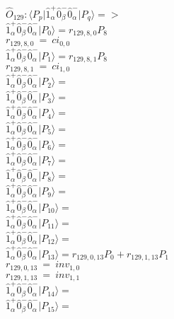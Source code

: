 \documentclass[14pt]{article}
\begin{document}
    $\hat{O}_{129}:  \langle{P_p}\vert \hat{1}_{\alpha}^{+}\hat{0}_{\beta}^{-}\hat{0}_{\alpha}^{-} \vert{P_q}\rangle => $ \\ 
    $ \hat{1}_{\alpha}^{+}\hat{0}_{\beta}^{-}\hat{0}_{\alpha}^{-} \vert{P_{0}}\rangle = {r}_{129,8,0}P_{8} $ \\ 
    ${r}_{129,8,0}\ =\ {ci}_{0,0} $ \\ 
    $ \hat{1}_{\alpha}^{+}\hat{0}_{\beta}^{-}\hat{0}_{\alpha}^{-} \vert{P_{1}}\rangle = {r}_{129,8,1}P_{8} $ \\ 
    ${r}_{129,8,1}\ =\ {ci}_{1,0} $ \\ 
    $ \hat{1}_{\alpha}^{+}\hat{0}_{\beta}^{-}\hat{0}_{\alpha}^{-} \vert{P_{2}}\rangle =  $ \\ 
    $ \hat{1}_{\alpha}^{+}\hat{0}_{\beta}^{-}\hat{0}_{\alpha}^{-} \vert{P_{3}}\rangle =  $ \\ 
    $ \hat{1}_{\alpha}^{+}\hat{0}_{\beta}^{-}\hat{0}_{\alpha}^{-} \vert{P_{4}}\rangle =  $ \\ 
    $ \hat{1}_{\alpha}^{+}\hat{0}_{\beta}^{-}\hat{0}_{\alpha}^{-} \vert{P_{5}}\rangle =  $ \\ 
    $ \hat{1}_{\alpha}^{+}\hat{0}_{\beta}^{-}\hat{0}_{\alpha}^{-} \vert{P_{6}}\rangle =  $ \\ 
    $ \hat{1}_{\alpha}^{+}\hat{0}_{\beta}^{-}\hat{0}_{\alpha}^{-} \vert{P_{7}}\rangle =  $ \\ 
    $ \hat{1}_{\alpha}^{+}\hat{0}_{\beta}^{-}\hat{0}_{\alpha}^{-} \vert{P_{8}}\rangle =  $ \\ 
    $ \hat{1}_{\alpha}^{+}\hat{0}_{\beta}^{-}\hat{0}_{\alpha}^{-} \vert{P_{9}}\rangle =  $ \\ 
    $ \hat{1}_{\alpha}^{+}\hat{0}_{\beta}^{-}\hat{0}_{\alpha}^{-} \vert{P_{10}}\rangle =  $ \\ 
    $ \hat{1}_{\alpha}^{+}\hat{0}_{\beta}^{-}\hat{0}_{\alpha}^{-} \vert{P_{11}}\rangle =  $ \\ 
    $ \hat{1}_{\alpha}^{+}\hat{0}_{\beta}^{-}\hat{0}_{\alpha}^{-} \vert{P_{12}}\rangle =  $ \\ 
    $ \hat{1}_{\alpha}^{+}\hat{0}_{\beta}^{-}\hat{0}_{\alpha}^{-} \vert{P_{13}}\rangle = {r}_{129,0,13}P_{0}+{r}_{129,1,13}P_{1} $ \\ 
    ${r}_{129,0,13}\ =\ {inv}_{1,0} $ \\ 
    ${r}_{129,1,13}\ =\ {inv}_{1,1} $ \\ 
    $ \hat{1}_{\alpha}^{+}\hat{0}_{\beta}^{-}\hat{0}_{\alpha}^{-} \vert{P_{14}}\rangle =  $ \\ 
    $ \hat{1}_{\alpha}^{+}\hat{0}_{\beta}^{-}\hat{0}_{\alpha}^{-} \vert{P_{15}}\rangle =  $ \\ 
    
\end{document}
